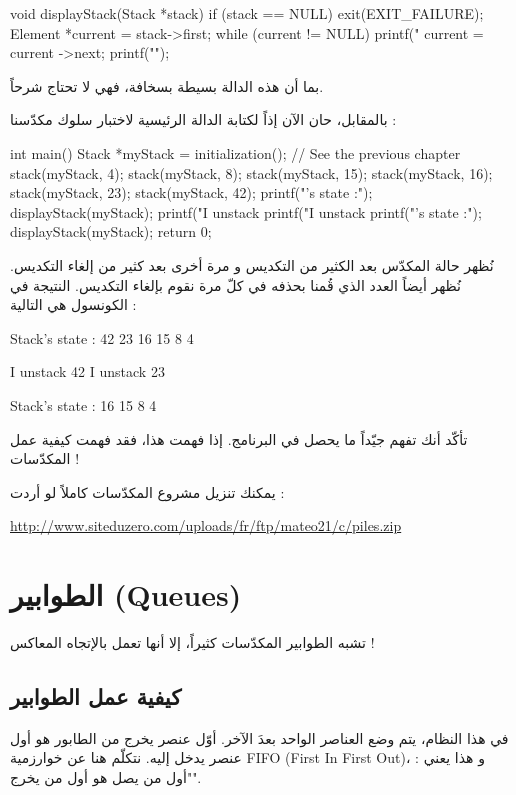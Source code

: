\begin{Csource}
void displayStack(Stack *stack)
{
	if (stack == NULL)
	{
		exit(EXIT_FAILURE);
	}
	Element *current = stack->first;
	while (current != NULL)
	{
		printf("%
		current = current ->next;
	}
	printf("\n");
}
\end{Csource}

بما أن هذه الدالة بسيطة بسخافة، فهي لا تحتاج شرحاً.

بالمقابل، حان الآن إذاً لكتابة الدالة الرئيسية لاختبار سلوك مكدّسنا :

\begin{Csource}
int main()
{
	Stack *myStack = initialization(); // See the previous chapter
	stack(myStack, 4);
	stack(myStack, 8);
	stack(myStack, 15);
	stack(myStack, 16);
	stack(myStack, 23);
	stack(myStack, 42);
	printf("\nStack's state :\n");
	displayStack(myStack);
	printf("I unstack %
	printf("I unstack %
	printf("\nStack's state :\n");
	displayStack(myStack);
	return 0;
}
\end{Csource}

نُظهر حالة المكدّس بعد الكثير من التكديس و مرة أخرى بعد كثير من إلغاء التكديس. نُظهر أيضاً العدد الذي قُمنا بحذفه في كلّ مرة نقوم بإلغاء التكديس. النتيجة في الكونسول هي التالية :

\begin{Console}
Stack's state :
42
23
16
15
8
4

I unstack 42
I unstack 23

Stack's state :
16
15
8
4
\end{Console}

تأكّد أنك تفهم جيّداً ما يحصل في البرنامج. إذا فهمت هذا، فقد فهمت كيفية عمل المكدّسات !

يمكنك تنزيل مشروع المكدّسات كاملاً لو أردت :

\url{http://www.siteduzero.com/uploads/fr/ftp/mateo21/c/piles.zip}

\section{الطوابير (\textenglish{Queues})}

تشبه الطوابير المكدّسات كثيراً، إلا أنها تعمل بالإتجاه المعاكس !

\subsection{كيفية عمل الطوابير}

في هذا النظام، يتم وضع العناصر الواحد بعدَ الآخر. أوّل عنصر يخرج من الطابور هو أول عنصر يدخل إليه. نتكلّم هنا عن خوارزمية 
\textenglish{FIFO} (\textenglish{First In First Out})،
و هذا يعني : "أول من يصل هو أول من يخرج".


